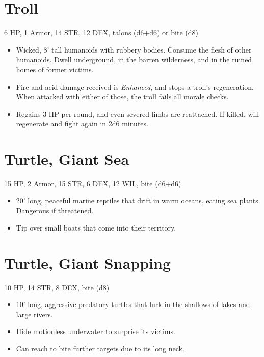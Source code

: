 \documentclass[
  10pt,
  american,
]{article}
\begin{document}
\hypertarget{troll}{%
\section{Troll}\label{troll}}

6 HP, 1 Armor, 14 STR, 12 DEX, talons (d6+d6) or bite (d8)

\begin{samepage}
\begin{itemize}
\setlength\itemsep{-.5em}
\item Wicked, 8’ tall humanoids with rubbery bodies. Consume the flesh of other humanoids. Dwell underground, in the barren  wilderness, and in the ruined homes of former victims.
\item Fire and acid damage received is \emph{Enhanced}, and stops a troll's regeneration. When attacked with either of those, the troll fails all morale checks.
\item Regains 3 HP per round, and even severed limbs are reattached. If killed, will regenerate and fight again in 2d6 minutes.
\end{itemize}
\end{samepage}

\hypertarget{turtle-giant-sea}{%
\section{Turtle, Giant Sea}\label{turtle-giant-sea}}

15 HP, 2 Armor, 15 STR, 6 DEX, 12 WIL, bite (d6+d6)

\begin{samepage}
\begin{itemize}
\setlength\itemsep{-.5em}
\item 20’ long, peaceful marine reptiles that drift in warm oceans, eating sea plants. Dangerous if threatened.
\item Tip over small boats that come into their territory.

\end{itemize}
\end{samepage}

\hypertarget{turtle-giant-snapping}{%
\section{Turtle, Giant Snapping~}\label{turtle-giant-snapping}}

10 HP, 14 STR, 8 DEX, bite (d8)

\begin{samepage}
\begin{itemize}
\setlength\itemsep{-.5em}
\item 10’ long, aggressive predatory turtles that lurk in the shallows of lakes and large rivers.
\item Hide motionless underwater to surprise its victims.
\item Can reach to bite further targets due to its long neck.
\end{itemize}
\end{samepage}
\end{document}
